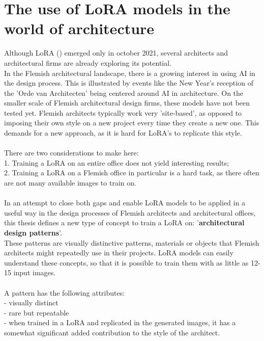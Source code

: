 \section{The use of LoRA models in the world of architecture}
Although LoRA (\cite{hu_lora_2021}) emerged only in october 2021, several architects and architectural firms are already exploring its potential. 
\\
In the Flemish architectural landscape, there is a growing interest in using AI in the design process. This is illustrated by events like the New Year's reception of the 'Orde van Architecten' being centered around AI in architecture. On the smaller scale of Flemish architectural design firms, these models have not been tested yet. Flemish architects typically work very 'site-based', as opposed to imposing their own style on a new project every time they create a new one. This demands for a new approach, as it is hard for LoRA's to replicate this style.\\
\\
There are two considerations to make here:\\ 
1. Training a LoRA on an entire office does not yield interesting results;\\
2. Training a LoRA on a Flemish office in particular is a hard task, as there often are not many available images to train on.\\
\\
In an attempt to close both gaps and enable LoRA models to be applied in a useful way in the design processes of Flemish architects and architectural offices, this thesis defines a new type of concept to train a LoRA on: '\textbf{architectural design patterns}'. \\
These patterns are visually distinctive patterns, materials or objects that Flemish architects might repeatedly use in their projects. LoRA models can easily understand these concepts, so that it is possible to train them with as little as 12-15 input images.\\
\\
A pattern has the following attributes: \\
- visually distinct\\
- rare but repeatable \\
- when trained in a LoRA and replicated in the generated images, it has a somewhat significant added contribution to the style of the architect.


